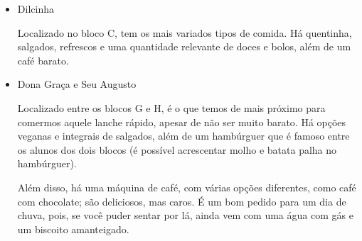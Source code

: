     \begin{itemize}
        \item Dilcinha
        
            Localizado no bloco C, tem os mais variados tipos de comida. Há quentinha, salgados, refrescos e uma quantidade relevante de doces e bolos, além de um café barato.
        
        
        \item Dona Graça e Seu Augusto
        
            Localizado entre os blocos G e H, é o que temos de mais próximo para comermos aquele lanche rápido, apesar de não ser muito barato. Há opções veganas e integrais de salgados, além de um hambúrguer que é famoso entre os alunos dos dois blocos (é possível acrescentar molho e batata palha no hambúrguer). 
            
            Além disso, há uma máquina de café, com várias opções diferentes, como café com chocolate; são deliciosos, mas caros. É um bom pedido para um dia de chuva, pois, se você puder sentar por lá, ainda vem com uma água com gás e um biscoito amanteigado.
    \end{itemize}
    
    